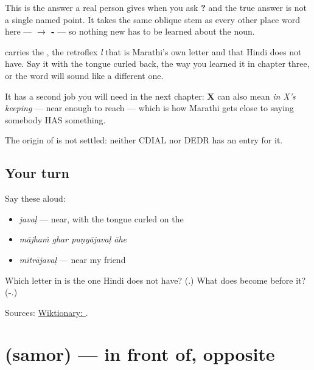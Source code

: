 This is the answer a real person gives when you ask \textbf{?} and the true answer is not a single named point. It takes the same oblique stem as every other place word here — \textbf{ $\to$ -} — so nothing new has to be learned about the noun.

\textbf{} carries the \textbf{}, the retroflex \emph{l} that is Marathi's own letter and that Hindi does not have. Say it with the tongue curled back, the way you learned it in chapter three, or the word will sound like a different one.

It has a second job you will need in the next chapter: \textbf{X } can also mean \emph{in X's keeping} — near enough to reach — which is how Marathi gets close to saying somebody HAS something.

\begin{cousinweb}
The origin of \textbf{} is not settled: neither CDIAL nor DEDR has an entry for it.
\end{cousinweb}

\subsection*{Your turn}
Say these aloud:

\begin{itemize}
\raggedright
  \item \emph{javaḷ} — near, with the tongue curled on the \textbf{}
  \item \emph{mājhaṁ ghar puṇyājavaḷ āhe}
  \item \emph{mitrājavaḷ} — near my friend
\end{itemize}

\begin{tcolorbox}[breakable,colback=teal!4,colframe=teal!35!black,title={Before you move on}]
Which letter in \textbf{} is the one Hindi does not have? (\textbf{}.) What does \textbf{} become before it? (\textbf{-}.)

Sources: \href{https://en.wiktionary.org/wiki/\%E0\%A4\%9C\%E0\%A4\%B5\%E0\%A4\%B3}{Wiktionary: }.
\end{tcolorbox}
\section[\texorpdfstring{\mr{समोर} (samor)}{समोर (samor)}]{ (samor) — in front of, opposite}

\label{lesson:MR-C43-samor}



